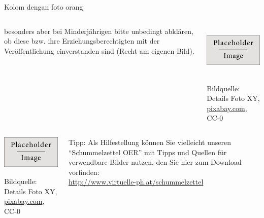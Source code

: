 \documentclass{beamer}
\begin{document}
\begin{frame}{Kolom dengan foto orang}
	\begin{columns}
		\begin{column}{5cm}
			\small besonders aber bei Minderjährigen bitte unbedingt abklären, ob diese bzw. ihre Erziehungsberechtigten mit der Veröffentlichung einverstanden sind (Recht am eigenen Bild).
		\end{column}
		\begin{column}{5cm}
			\begin{center}
				\includegraphics[height=2.5cm]{figures/placeholder}

				{\tiny \textcolor{digiPH_darkorange}{Bildquelle: Details Foto XY, \url{pixabay.com}, CC-0}}
			\end{center}
		\end{column}
	\end{columns}
	\begin{columns}
		\begin{column}{5cm}
			\begin{center}
				\includegraphics[width=5cm]{figures/placeholder}

				{\tiny \textcolor{digiPH_darkorange}{Bildquelle: Details Foto XY, \url{pixabay.com}, CC-0}}
			\end{center}
		\end{column}
		\begin{column}{5cm}
			\begin{block}{\small Tipp:}
				\scriptsize
				Als Hilfestellung können Sie vielleicht unseren \enquote{Schummelzettel OER} mit Tipps und Quellen für verwendbare Bilder nutzen, den Sie hier zum Download vorfinden:\\
				\url{http://www.virtuelle-ph.at/schummelzettel}
			\end{block}
		\end{column}
	\end{columns}
\end{frame}
\end{document}
